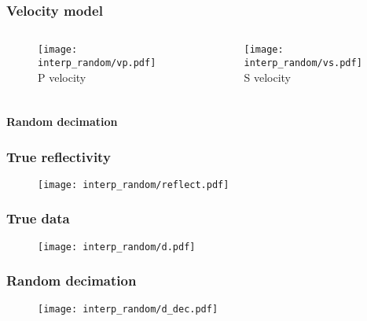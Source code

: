 \begin{frame}
\frametitle{Velocity model}
\begin{columns}[c]
\column{2in} 
	\begin{center}
	\begin{figure} 
	\texttt{[image: interp\_random/vp.pdf]} \\ 
	\tiny P velocity
	\end{figure} 
	\end{center}
\column{2in}
	\begin{center}
	\begin{figure} 
	\texttt{[image: interp\_random/vs.pdf]} \\
	\tiny S velocity
	\end{figure}
	\end{center}
\end{columns}
\end{frame}


\begin{frame} \frametitle{ }
	\begin{center}
        \LARGE {\bf Random decimation}
	\end{center}
\end{frame}

\begin{frame}
\frametitle{True reflectivity\\}
\begin{figure} 
\texttt{[image: interp\_random/reflect.pdf]} \\
\end{figure} 
\end{frame}

\begin{frame}
\frametitle{True data\\}
\begin{figure} 
\texttt{[image: interp\_random/d.pdf]} \\
\end{figure} 
\end{frame}

\begin{frame}
\frametitle{Random decimation\\}
\begin{figure} 
\texttt{[image: interp\_random/d\_dec.pdf]} \\
\end{figure} 
\end{frame}

